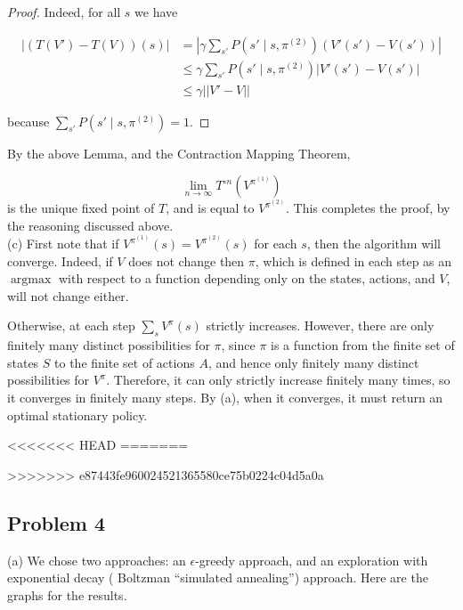 \documentclass[12pt]{article}
\DeclareMathOperator{\argmax}{argmax}
\theoremstyle{remark}
\begin{document}
\begin{proof}

Indeed, for all $s$ we have

\begin{align*}
|(T(V')-T(V))(s)| & = |\gamma \sum_{s'} P(s' \mid s, \pi^{(2)}) (V'(s') - V(s'))| \\
&\leq \gamma \sum_{s'} P(s' \mid s, \pi^{(2)}) |V'(s')-V(s')| \\
&\leq \gamma ||V'-V||
\end{align*}

because $\sum_{s'} P(s' \mid s, \pi^{(2)}) = 1$.

\end{proof}


By the above Lemma, and the Contraction Mapping Theorem,

\[
\lim_{n \rightarrow \infty} T^{\circ n}(V^{\pi^{(1)}})
\]
is the unique fixed point of $T$, and is equal to $V^{\pi^{(2)}}$. This completes the proof, by the reasoning discussed above. \\


\noindent (c) First note that if $V^{\pi^{(1)}}(s) = V^{\pi^{(2)}}(s)$ for each $s$, then the algorithm will converge. Indeed, if $V$ does not change then $\pi$, which is defined in each step as an $\argmax$ with respect to a function depending only on the states, actions, and $V$, will not change either.


Otherwise, at each step $\sum_s V^{\pi}(s)$ strictly increases. However, there are only finitely many distinct possibilities for $\pi$, since $\pi$ is a function from the finite set of states $S$ to the finite set of actions $A$, and hence only finitely many distinct possibilities for $V^{\pi}$. Therefore, it can only strictly increase finitely many times, so it converges in finitely many steps. By (a), when it converges, it must return an optimal stationary policy. 

<<<<<<< HEAD
=======



>>>>>>> e87443fe960024521365580ce75b0224c04d5a0a
\subsection*{Problem 4} (a) We chose two approaches: an $\epsilon$-greedy approach, and an exploration with exponential decay ( Boltzman ``simulated annealing'')  approach. Here are the graphs for the results. 
\end{document}
